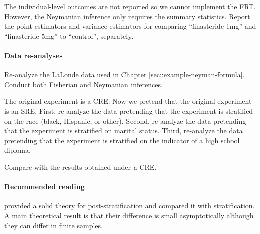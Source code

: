 The individual-level outcomes are not reported so we cannot implement the FRT. However, the Neymanian inference only requires the summary statistics. Report the point estimators and variance estimators for comparing ``finasteride 1mg'' and ``finasteride 5mg'' to ``control'', separately. 


\paragraph{Data re-analyses}
 
 
Re-analyze the LaLonde data used in Chapter \ref{sec::example-neyman-formula}. Conduct both Fisherian and Neymanian inferences. 

The original experiment is a CRE. Now we pretend that the original experiment is an SRE.
First, re-analyze the data pretending that the experiment is stratified on the race (black, Hispanic, or other). Second, re-analyze the data pretending that the experiment is stratified on marital status. Third, re-analyze the data pretending that the experiment is stratified on the indicator of a high school diploma. 

Compare with the results obtained under a CRE. 

 


\paragraph{Recommended reading}

\citet{miratrix:2013} provided a solid theory for post-stratification and compared it with stratification. A main theoretical result is that their difference is small asymptotically although they can differ in finite samples. 



